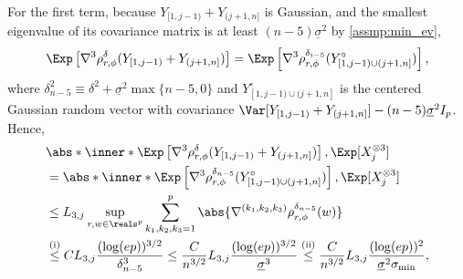 \documentclass[aos]{imsart}
\begin{document}
For the first term, 
because $Y_{[1,j-1)} + Y_{(j+1,n]}$ is Gaussian, and  the smallest eigenvalue of its covariance matrix is at least $(n-5) \underline{\sigma}^2$ by \cref{assmp:min_ev}, 
\begin{equation*}
    \Exp\left[ 
        \nabla^3 \rho_{r,\phi}^\delta(Y_{[1,j-1)} + Y_{(j+1,n]}) 
    \right]
    = \Exp\left[ 
        \nabla^3 \rho_{r,\phi}^{\delta_{i-5}}(Y^\circ_{[1,j-1)\cup(j+1,n]}) 
    \right],
\end{equation*}
where $\delta_{n-5}^2 \equiv \delta^2 + \underline{\sigma}^2 \max\{n-5,0\}$ and $Y^\circ_{[1,j-1)\cup(j+1,n]}$ is the centered Gaussian random vector with covariance $\Var[Y_{[1,j-1)} + Y_{(j+1,n]}] - (n-5) \underline{\sigma}^2 I_p$. %
Hence,
\begin{equation} \label{eq:third_moment_Gaussian_bound}
\begin{aligned}
    & \abs*{ \inner*{ 
        \Exp\left[ \nabla^3 \rho_{r,\phi}^\delta(Y_{[1,j-1)} + Y_{(j+1,n]}) \right], 
        \Exp[X_j^{\otimes 3}] } } \\
    & = \abs*{ \inner*{ 
        \Exp\left[ 
            \nabla^3 \rho_{r,\phi}^{\delta_{n-5}}(Y^\circ_{[1,j-1)\cup(j+1,n]}) 
        \right], 
        \Exp[X_j^{\otimes 3}] } } \\
    & \leq L_{3,j} \sup_{r, w \in \reals^p} \sum_{k_1,k_2,k_3 = 1}^p \abs{\nabla^{(k_1,k_2,k_3)} \rho_{r,\phi}^{\delta_{n-5}}(w)} \\
    & \overset{\mathrm{(i)}}{\leq} C L_{3,j} \frac{(\log(ep))^{3/2}}{\delta_{n-5}^3}
    \leq \frac{C}{n^{3/2}} L_{3,j} \frac{(\log(ep))^{3/2}}{\underline{\sigma}^3} 
    \overset{\mathrm{(ii)}}{\leq} \frac{C}{n^{3/2}} L_{3,j} \frac{(\log(ep))^2}{\underline{\sigma}^2 \sigma_{\min}},
\end{aligned}
\end{equation} 
\end{document}
